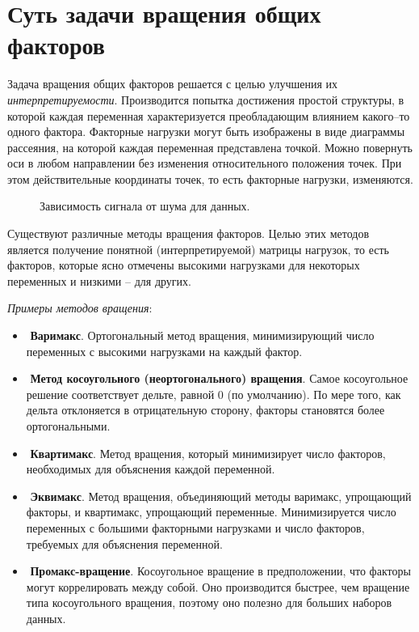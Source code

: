 \documentclass[a4paper, 12pt]{article}
\begin{document}
\section{Суть задачи вращения общих факторов}
Задача вращения общих факторов решается с целью улучшения их {\it интерпретируемости}. Производится попытка достижения простой структуры, в которой каждая переменная характеризуется преобладающим влиянием какого–то одного фактора. Факторные нагрузки могут быть изображены в виде диаграммы рассеяния, на которой каждая переменная представлена точкой. Можно повернуть оси в любом направлении без изменения относительного положения точек. При этом действительные координаты точек, то есть факторные нагрузки, изменяются. 
\begin{figure}[h!]
    \caption{Зависимость сигнала от шума для данных.}
    \label{ris:image}
    \end{figure}

Существуют различные методы вращения факторов. Целью этих методов является получение понятной (интерпретируемой) матрицы нагрузок, то есть факторов, которые ясно отмечены высокими нагрузками для некоторых переменных и низкими -- для других. 

{\it Примеры методов вращения}:
\begin{itemize}
    \item­	\textbf{Варимакс}. Ортогональный метод вращения, минимизирующий число переменных с высокими нагрузками на каждый фактор. 
    \item ­	\textbf{Метод косоугольного (неортогонального) вращения}. Самое косоугольное решение соответствует дельте, равной 0 (по умолчанию). По мере того, как дельта отклоняется в отрицательную сторону, факторы становятся более ортогональными.
    \item ­	\textbf{Квартимакс}. Метод вращения, который минимизирует число факторов, необходимых для объяснения каждой переменной.
    \item ­	\textbf{Эквимакс}. Метод вращения, объединяющий методы варимакс, упрощающий факторы, и квартимакс, упрощающий переменные. Минимизируется число переменных с большими факторными нагрузками и число факторов, требуемых для объяснения переменной.
    \item ­	\textbf{Промакс-вращение}. Косоугольное вращение в предположении, что факторы могут коррелировать между собой. Оно производится быстрее, чем вращение типа косоугольного вращения, поэтому оно полезно для больших наборов данных.
\end{itemize}
\end{document}
